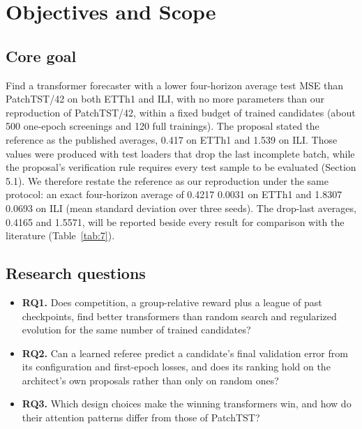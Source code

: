 \documentclass[11pt,letterpaper]{article}
\begin{document}
\section{Objectives and Scope}
\subsection{Core goal}
Find a transformer forecaster with a lower four-horizon average test MSE than PatchTST/42 on both ETTh1 and ILI, with no more parameters than our reproduction of PatchTST/42, within a fixed budget of trained candidates (about 500 one-epoch screenings and 120 full trainings). The proposal stated the reference as the published averages, 0.417 on ETTh1 and 1.539 on ILI. Those values were produced with test loaders that drop the last incomplete batch, while the proposal's verification rule requires every test sample to be evaluated (Section 5.1). We therefore restate the reference as our reproduction under the same protocol: an exact four-horizon average of 0.4217 \textpm{} 0.0031 on ETTh1 and 1.8307 \textpm{} 0.0693 on ILI (mean \textpm{} standard deviation over three seeds). The drop-last averages, 0.4165 and 1.5571, will be reported beside every result for comparison with the literature (Table~\ref{tab:7}).

\subsection{Research questions}
\begin{itemize}
\item \textbf{RQ1.} Does competition, a group-relative reward plus a league of past checkpoints, find better transformers than random search and regularized evolution for the same number of trained candidates?
\item \textbf{RQ2.} Can a learned referee predict a candidate's final validation error from its configuration and first-epoch losses, and does its ranking hold on the architect's own proposals rather than only on random ones?
\item \textbf{RQ3.} Which design choices make the winning transformers win, and how do their attention patterns differ from those of PatchTST?
\end{itemize}
\end{document}
